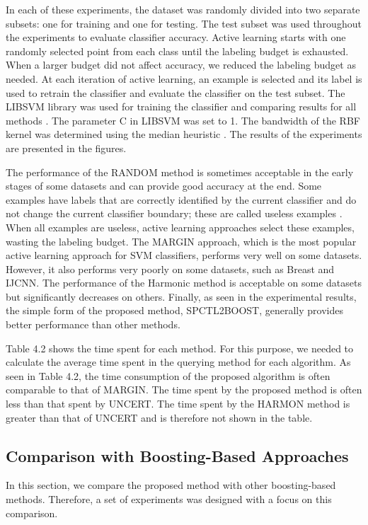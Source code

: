 	In each of these experiments, the dataset was randomly divided into two separate subsets: one for training and one for testing. The test subset was used throughout the experiments to evaluate classifier accuracy. Active learning starts with one randomly selected point from each class until the labeling budget is exhausted. When a larger budget did not affect accuracy, we reduced the labeling budget as needed. At each iteration of active learning, an example is selected and its label is used to retrain the classifier and evaluate the classifier on the test subset. The LIBSVM library was used for training the classifier and comparing results for all methods \cite{chang2011libsvm}. The parameter C in LIBSVM was set to 1. The bandwidth of the RBF kernel was determined using the median heuristic \cite{gretton2012kernel}. The results of the experiments are presented in the figures.
	
	The performance of the RANDOM method is sometimes acceptable in the early stages of some datasets and can provide good accuracy at the end. Some examples have labels that are correctly identified by the current classifier and do not change the current classifier boundary; these are called useless examples \cite{hospedales2010finding}. When all examples are useless, active learning approaches select these examples, wasting the labeling budget. The MARGIN approach, which is the most popular active learning approach for SVM classifiers, performs very well on some datasets. However, it also performs very poorly on some datasets, such as Breast and IJCNN. The performance of the Harmonic method is acceptable on some datasets but significantly decreases on others. Finally, as seen in the experimental results, the simple form of the proposed method, SPCTL2BOOST, generally provides better performance than other methods.
	
	Table 4.2 shows the time spent for each method. For this purpose, we needed to calculate the average time spent in the querying method for each algorithm. As seen in Table 4.2, the time consumption of the proposed algorithm is often comparable to that of MARGIN. The time spent by the proposed method is often less than that spent by UNCERT. The time spent by the HARMON method is greater than that of UNCERT and is therefore not shown in the table.
	
	\subsection{Comparison with Boosting-Based Approaches}
	In this section, we compare the proposed method with other boosting-based methods. Therefore, a set of experiments was designed with a focus on this comparison.
	
